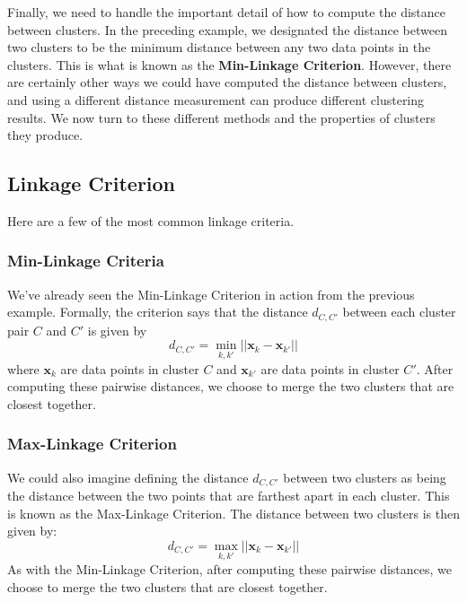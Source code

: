 Finally, we need to handle the important detail of how to compute the distance between clusters. In the preceding example, we designated the distance between two clusters to be the minimum distance between any two data points in the clusters. This is what is known as the \textbf{Min-Linkage Criterion}. However, there are certainly other ways we could have computed the distance between clusters, and using a different distance measurement can produce different clustering results. We now turn to these different methods and the properties of clusters they produce.

\subsection{Linkage Criterion}
Here are a few of the most common linkage criteria.

\subsubsection{Min-Linkage Criteria}
We've already seen the Min-Linkage Criterion in action from the previous example. Formally, the criterion says that the distance $d_{C, C'}$ between each cluster pair $C$ and $C'$ is given by
\begin{equation} \label{min-linkage-crit}
	d_{C, C'} = \underset{k, k'}{\min} || \textbf{x}_{k} - \textbf{x}_{k'} ||
\end{equation}
where $\textbf{x}_{k}$ are data points in cluster $C$ and $\textbf{x}_{k'}$ are data points in cluster $C'$. After computing these pairwise distances, we choose to merge the two clusters that are closest together.

\subsubsection{Max-Linkage Criterion}
We could also imagine defining the distance $d_{C, C'}$ between two clusters as being the distance between the two points that are farthest apart in each cluster. This is known as the Max-Linkage Criterion. The distance between two clusters is then given by:
\begin{equation} \label{max-linkage-crit}
	d_{C, C'} = \underset{k, k'}{\max} || \textbf{x}_{k} - \textbf{x}_{k'} ||
\end{equation}
As with the Min-Linkage Criterion, after computing these pairwise distances, we choose to merge the two clusters that are closest together.


